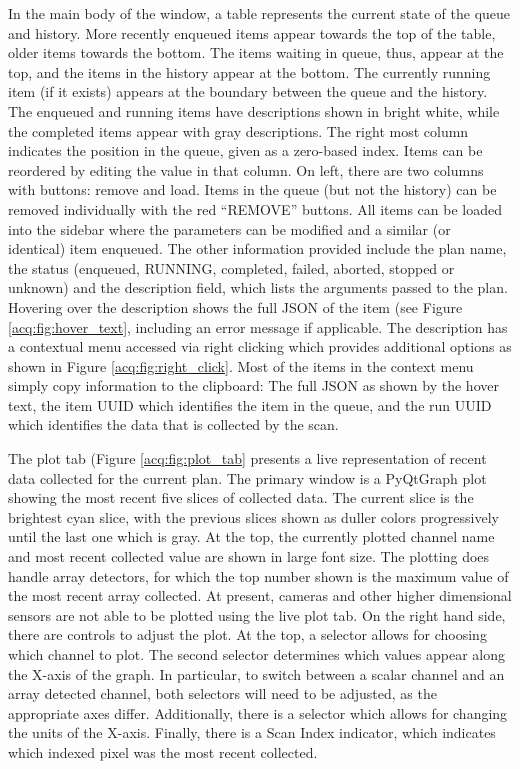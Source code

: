 \documentclass[11pt, full]{article}
\begin{document}
In the main body of the window, a table represents the current state of the queue and history.
More recently enqueued items appear towards the top of the table, older items towards the bottom.
The items waiting in queue, thus, appear at the top, and the items in the history appear at the bottom.
The currently running item (if it exists) appears at the boundary between the queue and the history.
The enqueued and running items have descriptions shown in bright white, while the completed items appear with gray descriptions.
The right most column indicates the position in the queue, given as a zero-based index.
Items can be reordered by editing the value in that column.
On left, there are two columns with buttons: remove and load.
Items in the queue (but not the history) can be removed individually with the red ``REMOVE'' buttons.
All items can be loaded into the sidebar where the parameters can be modified and a similar (or identical) item enqueued.
The other information provided include the plan name, the status (enqueued, RUNNING, completed, failed, aborted, stopped or unknown) and the description field, which lists the arguments passed to the plan.
Hovering over the description shows the full JSON of the item (see Figure \ref{acq:fig:hover_text}, including an error message if applicable.
The description has a contextual menu accessed via right clicking which provides additional options as shown in Figure \ref{acq:fig:right_click}.
Most of the items in the context menu simply copy information to the clipboard: The full JSON as shown by the hover text, the item \Gls{UUID} which identifies the item in the queue, and the run \Gls{UUID} which identifies the data that is collected by the scan.

The plot tab (Figure \ref{acq:fig:plot_tab} presents a live representation of recent data collected for the current plan.
The primary window is a PyQtGraph\cite{pyqtgraph} plot showing the most recent five slices of collected data.
The current slice is the brightest cyan slice, with the previous slices shown as duller colors progressively until the last one which is gray.
At the top, the currently plotted channel name and most recent collected value are shown in large font size.
The plotting does handle array detectors, for which the top number shown is the maximum value of the most recent array collected.
At present, cameras and other higher dimensional sensors are not able to be plotted using the live plot tab.
On the right hand side, there are controls to adjust the plot.
At the top, a selector allows for choosing which channel to plot.
The second selector determines which values appear along the X-axis of the graph.
In particular, to switch between a scalar channel and an array detected channel, both selectors will need to be adjusted, as the appropriate axes differ.
Additionally, there is a selector which allows for changing the units of the X-axis.
Finally, there is a Scan Index indicator, which indicates which indexed pixel was the most recent collected.
\end{document}
